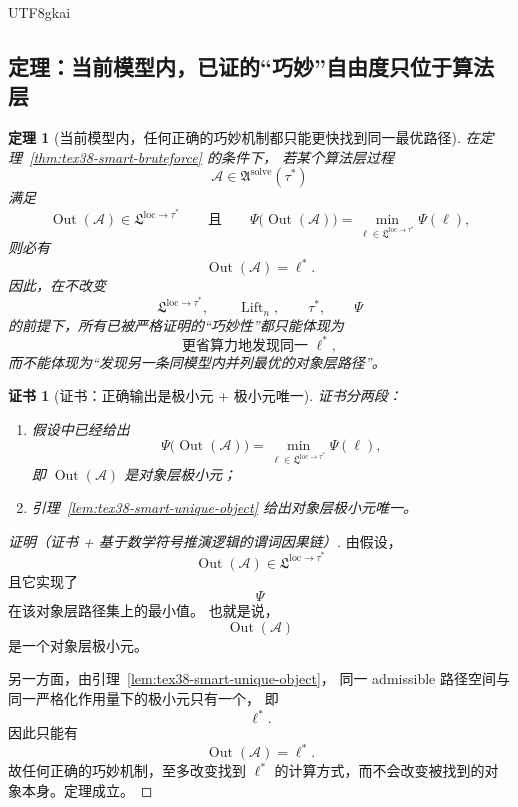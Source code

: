 \documentclass[12pt]{article}
\newtheorem{theorem}{定理}[section]
\newtheorem{Certificate}{证书}[section]
\newcommand{\Lift}{\operatorname{Lift}}
\begin{document}
\begin{CJK*}{UTF8}{gkai}
\subsection{定理：当前模型内，已证的“巧妙”自由度只位于算法层}
\label{subsec:tex38-smart-theorem}

\begin{theorem}[当前模型内，任何正确的巧妙机制都只能更快找到同一最优路径]
\label{thm:tex38-smart-algorithmic}
在定理~\ref{thm:tex38-smart-bruteforce} 的条件下，
若某个算法层过程
\[
  \mathcal A\in\mathfrak A^{\mathrm{solve}}(\tau^\ast)
\]
满足
\[
  \operatorname{Out}(\mathcal A)\in\mathfrak L^{\mathrm{loc}\to\tau^\ast}
  \qquad\text{且}\qquad
  \Psi\bigl(\operatorname{Out}(\mathcal A)\bigr)
  =
  \min_{\ell\in\mathfrak L^{\mathrm{loc}\to\tau^\ast}}\Psi(\ell),
\]
则必有
\[
  \operatorname{Out}(\mathcal A)=\ell^\ast.
\]
因此，在不改变
\[
  \mathfrak L^{\mathrm{loc}\to\tau^\ast},
  \qquad
  \Lift_n,
  \qquad
  \tau^\ast,
  \qquad
  \Psi
\]
的前提下，所有已被严格证明的“巧妙性”都只能体现为
\[
  \text{更省算力地发现同一 }\ell^\ast,
\]
而不能体现为“发现另一条同模型内并列最优的对象层路径”。
\end{theorem}

\begin{Certificate}[证书：正确输出是极小元 + 极小元唯一]
\label{cert:tex38-smart-algorithmic}
证书分两段：
\begin{enumerate}
  \item 假设中已经给出
  \[
    \Psi\bigl(\operatorname{Out}(\mathcal A)\bigr)
    =
    \min_{\ell\in\mathfrak L^{\mathrm{loc}\to\tau^\ast}}
    \Psi(\ell),
  \]
  即 $\operatorname{Out}(\mathcal A)$ 是对象层极小元；
  \item 引理~\ref{lem:tex38-smart-unique-object} 给出对象层极小元唯一。
\end{enumerate}
\end{Certificate}

\begin{proof}[证明（证书 + 基于数学符号推演逻辑的谓词因果链）]
由假设，
\[
  \operatorname{Out}(\mathcal A)\in\mathfrak L^{\mathrm{loc}\to\tau^\ast}
\]
且它实现了
\[
  \Psi
\]
在该对象层路径集上的最小值。
也就是说，
\[
  \operatorname{Out}(\mathcal A)
\]
是一个对象层极小元。

另一方面，由引理~\ref{lem:tex38-smart-unique-object}，
同一 admissible 路径空间与同一严格化作用量下的极小元只有一个，
即
\[
  \ell^\ast.
\]
因此只能有
\[
  \operatorname{Out}(\mathcal A)=\ell^\ast.
\]
故任何正确的巧妙机制，至多改变找到 $\ell^\ast$ 的计算方式，而不会改变被找到的对象本身。定理成立。
\end{proof}


\end{CJK*}
\end{document}
